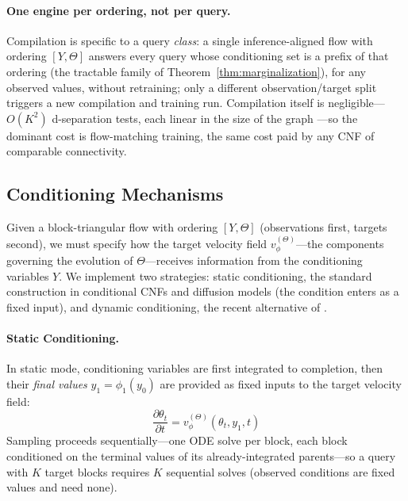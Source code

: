 \paragraph{One engine per ordering, not per query.} Compilation is specific to a query \emph{class}: a single inference-aligned flow with ordering $[Y, \Theta]$ answers every query whose conditioning set is a prefix of that ordering (the tractable family of Theorem~\ref{thm:marginalization}), for any observed values, without retraining; only a different observation/target split triggers a new compilation and training run. Compilation itself is negligible---$O(K^2)$ d-separation tests, each linear in the size of the graph \citep{Koller2009}---so the dominant cost is flow-matching training, the same cost paid by any CNF of comparable connectivity.

\subsection{Conditioning Mechanisms}
\label{sec:conditioning}

Given a block-triangular flow with ordering $[Y, \Theta]$ (observations first, targets second), we must specify how the target velocity field $v^{(\Theta)}_\phi$---the components governing the evolution of $\Theta$---receives information from the conditioning variables $Y$. We implement two strategies: static conditioning, the standard construction in conditional CNFs and diffusion models (the condition enters as a fixed input), and dynamic conditioning, the recent alternative of \citet{jeong_conditional_2025}.

\paragraph{Static Conditioning.}
In static mode, conditioning variables are first integrated to completion, then their \emph{final values} $y_1 = \phi_1(y_0)$ are provided as fixed inputs to the target velocity field:
\begin{equation}
    \frac{\partial \theta_t}{\partial t} = v^{(\Theta)}_\phi(\theta_t, y_1, t)
\end{equation}
Sampling proceeds sequentially---one ODE solve per block, each block conditioned on the terminal values of its already-integrated parents---so a query with $K$ target blocks requires $K$ sequential solves (observed conditions are fixed values and need none).

